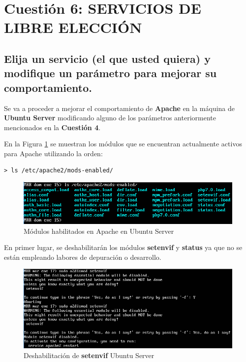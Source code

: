 \section{Cuestión 6: SERVICIOS DE LIBRE ELECCIÓN}

\subsection{Elija un servicio (el que usted quiera) y modifique un parámetro para
	mejorar su comportamiento.}

Se va a proceder a mejorar el comportamiento de \textbf{Apache} en la máquina de \textbf{Ubuntu Server} modificando alguno de los parámetros anteriormente mencionados en la \textbf{Cuestión 4}.

En la Figura \ref{fig:figura6-1} se muestran los módulos que se encuentran actualmente activos para Apache utilizando la orden:
\begin{lstlisting}[style=fich]
> ls /etc/apache2/mods-enabled/
\end{lstlisting}
\vspace{-25pt}
	\begin{figure}[H] %
		\centering
		\includegraphics[scale=0.9]{figuras/ejercicio6/figura6-1.png} 
		\caption{Módulos habilitados en Apache en Ubuntu Server} 
		\label{fig:figura6-1}
	\end{figure}
\vspace{-10pt}
En primer lugar, se deshabilitarán los módulos \textbf{setenvif} y \textbf{status} ya que no se están empleando labores de depuración o desarrollo.
\begin{figure}[H] %
	\centering
	\includegraphics[scale=0.8]{figuras/ejercicio6/figura6-3.png} 
	\caption{Deshabilitación de \textbf{setenvif} Ubuntu Server} 
	\label{fig:figura6-3}
\end{figure}
